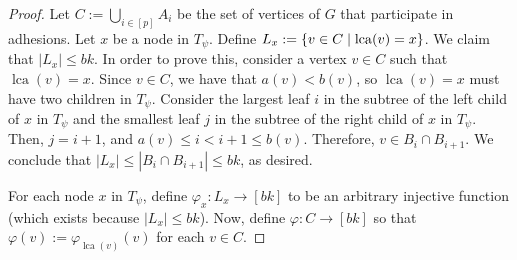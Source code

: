 \documentclass[twoside,leqno]{article}
\renewcommand{\le}{\leqslant}
\renewcommand{\leq}{\leqslant}
\DeclareMathOperator{\lca}{lca}
\DeclarePairedDelimiter{\set}{\{}{\}}
\begin{document}
\begin{proof}
  Let $C:=\bigcup_{i\in[p]} A_i$  be the set of vertices of $G$ that participate in adhesions.
  Let $x$ be a node in $T_{\psi}$.
  Define $L_x := \set{v\in C \mid \lca(v)=x}$.
  We claim that $|L_x| \leq bk$.
  In order to prove this, consider a vertex $v\in C$ such that $\lca(v)=x$.
  Since $v\in C$, we have that $a(v) < b(v)$, so
  $\lca(v)=x$ must have two children in $T_{\psi}$.
  Consider the largest leaf $i$ in the subtree of the left child of $x$ in $T_{\psi}$ and
  the smallest leaf $j$ in the subtree of the right child of $x$ in $T_{\psi}$.
  Then, $j=i+1$, and  $a(v)\leq i < i+1 \leq b(v)$.
  Therefore, $v\in B_{i}\cap B_{i+1}$.
  We conclude that
  $|L_x| \leq |B_i\cap B_{i+1}| \leq bk$, as desired.

  For each node $x$ in $T_{\psi}$, define $\varphi_x: L_x\to[bk]$ to be an arbitrary injective function (which exists because $|L_x|\le bk$). Now,  define $\varphi: C\to [bk]$ so that
  $\varphi(v):=\varphi_{\lca(v)}(v)$ for each $v\in C$.


\end{proof}
\end{document}
